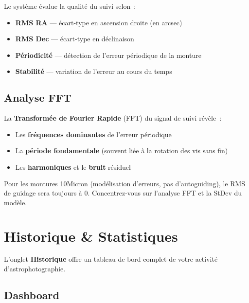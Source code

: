 \documentclass[a4paper,11pt]{article}
\begin{document}
Le syst\`{e}me \'{e}value la qualit\'{e} du suivi selon~:

\begin{itemize}
    \item \textbf{RMS RA} --- \'{e}cart-type en ascension droite (en arcsec)
    \item \textbf{RMS Dec} --- \'{e}cart-type en d\'{e}clinaison
    \item \textbf{P\'{e}riodicit\'{e}} --- d\'{e}tection de l'erreur p\'{e}riodique de la monture
    \item \textbf{Stabilit\'{e}} --- variation de l'erreur au cours du temps
\end{itemize}

\subsection{Analyse FFT}

La \textbf{Transform\'{e}e de Fourier Rapide} (FFT) du signal de suivi r\'{e}v\`{e}le~:

\begin{itemize}
    \item Les \textbf{fr\'{e}quences dominantes} de l'erreur p\'{e}riodique
    \item La \textbf{p\'{e}riode fondamentale} (souvent li\'{e}e \`{a} la rotation des vis sans fin)
    \item Les \textbf{harmoniques} et le \textbf{bruit} r\'{e}siduel
\end{itemize}

\begin{tipbox}
Pour les montures 10Micron (mod\'{e}lisation d'erreurs, pas d'autoguiding), le RMS de guidage sera toujours \`{a} 0. Concentrez-vous sur l'analyse FFT et la StDev du mod\`{e}le.
\end{tipbox}


\section{Historique \& Statistiques}
\label{sec:historique}

L'onglet \textbf{Historique} offre un tableau de bord complet de votre activit\'{e} d'astrophotographie.

\subsection{Dashboard}
\end{document}
